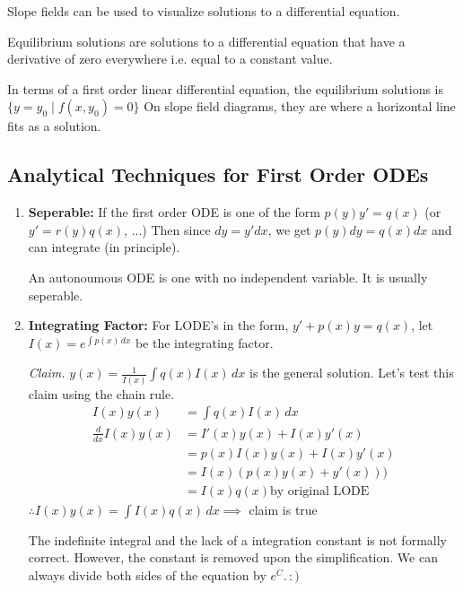\documentclass[../main.tex]{subfiles}
\begin{document}
\begin{note}
    Slope fields can be used to visualize solutions to a differential equation.
\end{note}

\begin{definition}
    Equilibrium solutions are solutions to a differential equation that have a derivative of zero everywhere i.e. equal to a constant value.
\end{definition}

In terms of a first order linear differential equation, the equilibrium solutions is \( \{ y = y_0 \mid f(x,y_0)=0 \} \)
On slope field diagrams, they are where a horizontal line fits as a solution.


\subsection{Analytical Techniques for First Order ODEs}

\begin{enumerate}[mode=unboxed]
    \item \textbf{Seperable:} If the first order ODE is one of the form \( p(y)y'=q(x) \) (or \( y'=r(y)q(x) \), ...)
        Then since \( dy=y'dx \), we get \( p(y)dy=q(x)dx \) and can integrate (in principle).
        \begin{definition}
            An autonoumous ODE is one with no independent variable. It is usually seperable.
        \end{definition}
    \item \textbf{Integrating Factor:} For LODE's in the form, \( y'+p(x)y=q(x) \), let \( I(x)= e^{\int p(x) \,dx} \) be the integrating factor.

        \textit{Claim.} \( y(x)= \frac{1}{I(x)}\int q(x) I(x) \,dx \) is the general solution.
        Let's test this claim using the chain rule.
        \begin{align*}
            I(x)y(x)&=\int q(x) I(x) \,dx \\
            \frac{d}{dx}I(x)y(x)&=I'(x)y(x)+I(x)y'(x) \\
            &= p(x)I(x)y(x)+I(x)y'(x) \\
            &= I(x)(p(x)y(x)+y'(x))) \\
            &= I(x)q(x) \text{by original LODE}
        \end{align*}
        \( \therefore I(x)y(x)=\int I(x)q(x) \,dx \implies\) claim is true 

        \begin{note}
            The indefinite integral and the lack of a integration constant is not formally correct.
            However, the constant is removed upon the simplification.
            We can always divide both sides of the equation by \( e^{C}.\, :) \)
        \end{note}
\end{enumerate}
\end{document}
